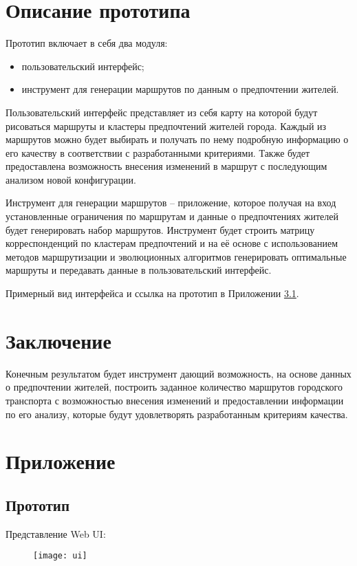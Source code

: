 \chapter{Описание прототипа}
Прототип включает в себя два модуля: 
\begin{itemize}\itemsep-5pt
    \item пользовательский интерфейс;
    \item инструмент для генерации маршрутов по данным о предпочтении жителей. 
\end{itemize}

Пользовательский интерфейс представляет из себя карту на которой будут рисоваться маршруты и 
кластеры предпочтений жителей города. Каждый из маршрутов можно будет выбирать и получать по нему 
подробную информацию о его качеству в соответствии с разработанными критериями. Также будет 
предоставлена возможность внесения изменений в маршрут с последующим анализом новой конфигурации.

Инструмент для генерации маршрутов -- приложение, которое получая на вход установленные 
ограничения по маршрутам и данные о предпочтениях жителей будет генерировать набор маршрутов. 
Инструмент будет строить матрицу корреспонденций по кластерам предпочтений и на её основе с 
использованием методов маршрутизации и эволюционных алгоритмов генерировать оптимальные маршруты и 
передавать данные в пользовательский интерфейс.

Примерный вид интерфейса и ссылка на прототип в Приложении \ref{ref:ui}.

\chapter{Заключение}
Конечным результатом будет инструмент дающий возможность, на основе данных о предпочтении жителей, 
построить заданное количество маршрутов городского транспорта с возможностью внесения изменений и 
предоставлении информации по его анализу, которые будут удовлетворять разработанным критериям качества.

\chapter{Приложение}
\section{Прототип}\label{ref:ui}
Представление Web UI:
\begin{figure}[ht!]
    \texttt{[image: ui]}
\end{figure}

